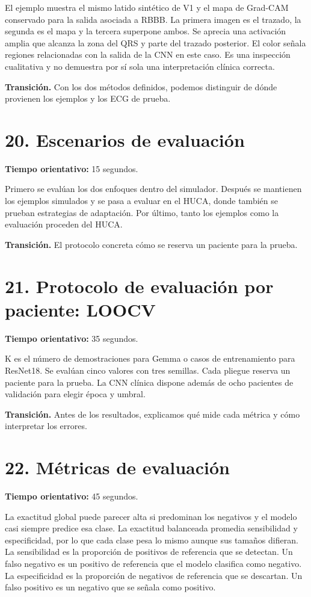 \documentclass[11pt,a4paper]{article}
\begin{document}
El ejemplo muestra el mismo latido sintético de V1 y el mapa de Grad-CAM conservado para la salida asociada a RBBB. La primera imagen es el trazado, la segunda es el mapa y la tercera superpone ambos. Se aprecia una activación amplia que alcanza la zona del QRS y parte del trazado posterior. El color señala regiones relacionadas con la salida de la CNN en este caso. Es una inspección cualitativa y no demuestra por sí sola una interpretación clínica correcta.

\textbf{Transición.} Con los dos métodos definidos, podemos distinguir de dónde provienen los ejemplos y los ECG de prueba.

\section*{20. Escenarios de evaluación}
\textbf{Tiempo orientativo: }15 segundos.

Primero se evalúan los dos enfoques dentro del simulador. Después se mantienen los ejemplos simulados y se pasa a evaluar en el HUCA, donde también se prueban estrategias de adaptación. Por último, tanto los ejemplos como la evaluación proceden del HUCA.

\textbf{Transición.} El protocolo concreta cómo se reserva un paciente para la prueba.

\section*{21. Protocolo de evaluación por paciente: LOOCV}
\textbf{Tiempo orientativo: }35 segundos.

K es el número de demostraciones para Gemma o casos de entrenamiento para ResNet18. Se evalúan cinco valores con tres semillas. Cada pliegue reserva un paciente para la prueba. La CNN clínica dispone además de ocho pacientes de validación para elegir época y umbral.

\textbf{Transición.} Antes de los resultados, explicamos qué mide cada métrica y cómo interpretar los errores.

\section*{22. Métricas de evaluación}
\textbf{Tiempo orientativo: }45 segundos.

La exactitud global puede parecer alta si predominan los negativos y el modelo casi siempre predice esa clase. La exactitud balanceada promedia sensibilidad y especificidad, por lo que cada clase pesa lo mismo aunque sus tamaños difieran. La sensibilidad es la proporción de positivos de referencia que se detectan. Un falso negativo es un positivo de referencia que el modelo clasifica como negativo. La especificidad es la proporción de negativos de referencia que se descartan. Un falso positivo es un negativo que se señala como positivo.
\end{document}
